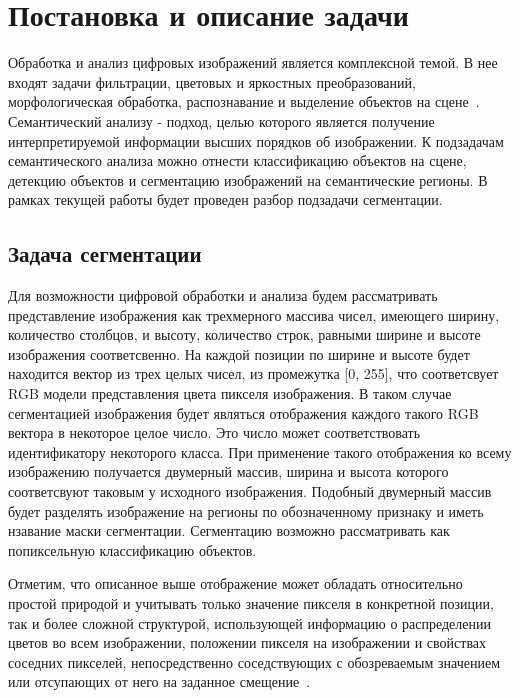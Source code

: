 \section{Постановка и описание задачи}
\label{task_description_start}

Обработка и анализ цифровых изображений является комплексной темой. В нее входят задачи фильтрации, цветовых и яркостных преобразований, морфологическая обработка, распознавание и выделение объектов на сцене~\autocite{gonzalez2008digital}. Семантический анализу - подход, целью которого является получение интерпретируемой информации высших порядков об изображении. К подзадачам семантического анализа можно отнести классификацию объектов на сцене, детекцию объектов и сегментацию изображений на семантические регионы. В рамках текущей работы будет проведен разбор подзадачи сегментации.

\subsection{Задача сегментации}

Для возможности цифровой обработки и анализа будем рассматривать представление изображения как трехмерного массива чисел, имеющего ширину, количество столбцов, и высоту, количество строк, равными ширине и высоте изображения соответсвенно. На каждой позиции по ширине и высоте будет находится вектор из трех целых чисел, из промежутка [0, 255], что соответсвует RGB модели представления цвета пикселя изображения. В таком случае сегментацией изображения будет являться отображения каждого такого RGB вектора в некоторое целое число. Это число может соответствовать идентификатору некоторого класса. При применение такого отображения ко всему изображению получается двумерный массив, ширина и высота которого соответсвуют таковым у исходного изображения. Подобный двумерный массив будет разделять изображение на регионы по обозначенному признаку и иметь нзавание маски сегментации. Сегментацию возможно рассматривать как попиксельную классификацию объектов.

Отметим, что описанное выше отображение может обладать относительно простой природой и учитывать только значение пикселя в конкретной позиции, так и более сложной структурой, использующей информацию о распределении цветов во всем изображении, положении пикселя на изображении и свойствах соседних пикселей, непосредственно соседствующих с обозреваемым значением или отсупающих от него на заданное смещение~\autocite{liu2018recent}.

